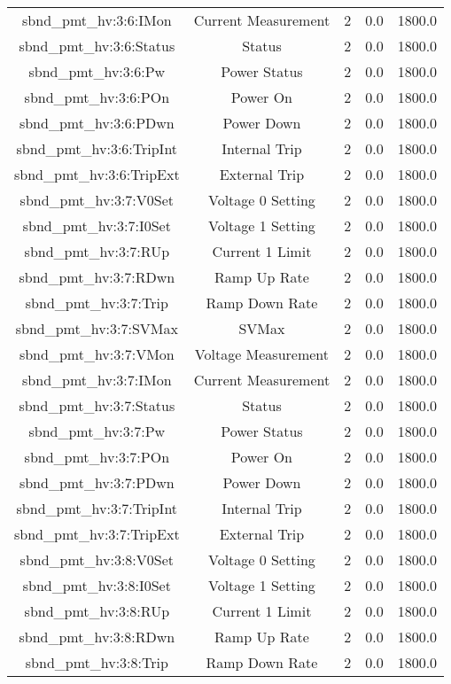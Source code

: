 \begin{center}
\begin{longtable}{c | c c c c }
sbnd\_pmt\_hv:3:6:IMon & Current Measurement & 2 & 0.0 & 1800.0\\ 
sbnd\_pmt\_hv:3:6:Status & Status & 2 & 0.0 & 1800.0\\ 
sbnd\_pmt\_hv:3:6:Pw & Power Status & 2 & 0.0 & 1800.0\\ 
sbnd\_pmt\_hv:3:6:POn & Power On & 2 & 0.0 & 1800.0\\ 
sbnd\_pmt\_hv:3:6:PDwn & Power Down & 2 & 0.0 & 1800.0\\ 
sbnd\_pmt\_hv:3:6:TripInt & Internal Trip & 2 & 0.0 & 1800.0\\ 
sbnd\_pmt\_hv:3:6:TripExt & External Trip & 2 & 0.0 & 1800.0\\ 
sbnd\_pmt\_hv:3:7:V0Set & Voltage 0 Setting & 2 & 0.0 & 1800.0\\ 
sbnd\_pmt\_hv:3:7:I0Set & Voltage 1 Setting & 2 & 0.0 & 1800.0\\ 
sbnd\_pmt\_hv:3:7:RUp & Current 1 Limit & 2 & 0.0 & 1800.0\\ 
sbnd\_pmt\_hv:3:7:RDwn & Ramp Up Rate & 2 & 0.0 & 1800.0\\ 
sbnd\_pmt\_hv:3:7:Trip & Ramp Down Rate & 2 & 0.0 & 1800.0\\ 
sbnd\_pmt\_hv:3:7:SVMax & SVMax & 2 & 0.0 & 1800.0\\ 
sbnd\_pmt\_hv:3:7:VMon & Voltage Measurement & 2 & 0.0 & 1800.0\\ 
sbnd\_pmt\_hv:3:7:IMon & Current Measurement & 2 & 0.0 & 1800.0\\ 
sbnd\_pmt\_hv:3:7:Status & Status & 2 & 0.0 & 1800.0\\ 
sbnd\_pmt\_hv:3:7:Pw & Power Status & 2 & 0.0 & 1800.0\\ 
sbnd\_pmt\_hv:3:7:POn & Power On & 2 & 0.0 & 1800.0\\ 
sbnd\_pmt\_hv:3:7:PDwn & Power Down & 2 & 0.0 & 1800.0\\ 
sbnd\_pmt\_hv:3:7:TripInt & Internal Trip & 2 & 0.0 & 1800.0\\ 
sbnd\_pmt\_hv:3:7:TripExt & External Trip & 2 & 0.0 & 1800.0\\ 
sbnd\_pmt\_hv:3:8:V0Set & Voltage 0 Setting & 2 & 0.0 & 1800.0\\ 
sbnd\_pmt\_hv:3:8:I0Set & Voltage 1 Setting & 2 & 0.0 & 1800.0\\ 
sbnd\_pmt\_hv:3:8:RUp & Current 1 Limit & 2 & 0.0 & 1800.0\\ 
sbnd\_pmt\_hv:3:8:RDwn & Ramp Up Rate & 2 & 0.0 & 1800.0\\ 
sbnd\_pmt\_hv:3:8:Trip & Ramp Down Rate & 2 & 0.0 & 1800.0\\ 

\end{longtable}
\end{center}
